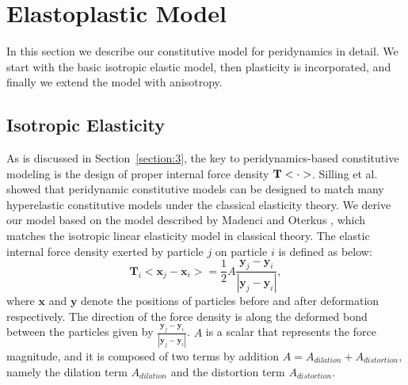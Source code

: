 \section{Elastoplastic Model}

In this section we describe our constitutive model for peridynamics in detail. We start with the basic isotropic elastic model, then plasticity is incorporated, and finally we extend the model with anisotropy.

\subsection{Isotropic Elasticity}

As is discussed in Section~\ref{section:3}, the key to peridynamics-based constitutive modeling is the design of proper internal force density $\nobreak{\mathbf{T}<\cdot>}$. Silling et al.\cite{silling2007peridynamic} showed that peridynamic constitutive models can be designed to match many hyperelastic constitutive models under the classical elasticity theory. We derive our model based on the model described by Madenci and Oterkus \cite{madenci2014peridynamic}, which matches the isotropic linear elasticity model in classical theory. The elastic internal force density exerted by particle $j$ on particle $i$ is defined as below:
\begin{equation}
\mathbf{T}_i<\mathbf{x}_j-\mathbf{x}_i> = \frac{1}{2}A\frac{\mathbf{y}_j-\mathbf{y}_i}{|\mathbf{y}_j-\mathbf{y}_i|},
\label{eq:2}
\end{equation}
where $\mathbf{x}$ and $\mathbf{y}$ denote the positions of particles before and after deformation respectively. The direction of the force density is along the deformed bond between the particles given by $\frac{\mathbf{y}_j-\mathbf{y}_i}{|\mathbf{y}_j-\mathbf{y}_i|}$. $A$ is a scalar that represents the force magnitude, and it is composed of two terms by addition $A = A_{dilation} + A_{distortion}$, namely the dilation term $A_{dilation}$ and the distortion term $A_{distortion}$.

